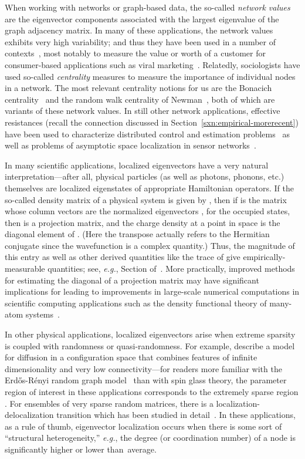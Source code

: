 \documentclass[twoside]{article}
\begin{document}
When working with networks or graph-based data, the so-called 
\emph{network values} are the eigenvector components associated with the 
largest eigenvalue of the graph adjacency matrix.
In many of these applications, the network values exhibits very high 
variability; and thus they have been used in a number of 
contexts~\cite{CF06_survey}, most notably to measure the value or worth of 
a customer for consumer-based applications such as viral 
marketing~\cite{RD02}.
Relatedly, sociologists have used so-called \emph{centrality} measures to 
measure the importance of individual nodes in a network.
The most relevant centrality notions for us are the Bonacich 
centrality~\cite{Bon87} and the random walk centrality of 
Newman~\cite{newman05_betweenness}, both of which are variants of these 
network values.
In still other network applications, effective resistances (recall the 
connection discussed in Section~\ref{sxn:empirical-morerecent}) have been 
used to characterize distributed control and estimation problems~\cite{BH06} 
as well as problems of asymptotic space localization in sensor 
networks~\cite{JLHB07}.

In many scientific applications, localized eigenvectors have a very natural 
interpretation---after all, physical particles (as well as photons, phonons, 
etc.) themselves are localized eigenstates of appropriate Hamiltonian 
operators.
If the so-called density matrix of a physical system is given by
, then if 
 is the matrix whose column vectors are the normalized eigenvectors 
, for the  occupied states, then  is a
projection matrix, and the charge density at a point  in space is the 
 diagonal element of .
(Here the transpose actually refers to the Hermitian conjugate since the 
wavefunction  is a complex quantity.)
Thus, the magnitude of this entry as well as other derived quantities like
the trace of  give empirically-measurable quantities; see, 
\emph{e.g.}, Section  of~\cite{SCS10}.
More practically, improved methods for estimating the diagonal of a 
projection matrix may have significant implications for leading to 
improvements in large-scale numerical computations in scientific computing 
applications such as the density functional theory of many-atom 
systems~\cite{SCS10,BKS07}.

In other physical applications, localized eigenvectors arise when extreme 
sparsity is coupled with randomness or quasi-randomness.
For example, \cite{BR88,RB88} describe a model for diffusion in a
configuration space that combines features of infinite dimensionality and 
very low connectivity---for readers more familiar with the 
Erd\H{o}s-R\'{e}nyi  random graph model~\cite{erdos60random} than 
with spin glass theory, the parameter region of interest in these 
applications corresponds to the extremely sparse region 
.
For ensembles of very sparse random matrices, there is a 
localization-delocalization transition which has been studied in 
detail~\cite{FM91,MF91,Eva92,Kuh08}. 
In these applications, as a rule of thumb, eigenvector localization occurs 
when there is some sort of ``structural heterogeneity,'' \emph{e.g.}, 
the degree (or coordination number) of a node is significantly higher or 
lower than~average.
\end{document}
